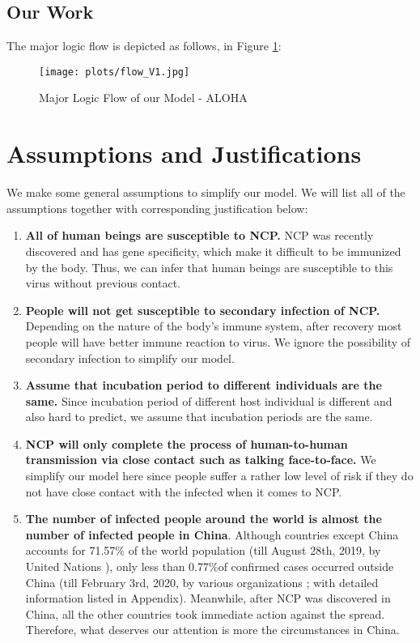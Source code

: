 \documentclass{mcmthesis}
\begin{document}
\subsection{Our Work}
	

	The major logic flow is depicted as follows, in Figure \ref{fig:flow}:
	
	\begin{figure}[H]
    \centering
    \texttt{[image: plots/flow\_V1.jpg]} %
    \caption{Major Logic Flow of our Model - ALOHA}
    \label{fig:flow}
    \end{figure}


\section{Assumptions and Justifications}\label{S2}
    We make some general assumptions to simplify our model. We will list all of the assumptions together with corresponding justification below:
\begin{enumerate}[1)]
	\item {\bfseries All of human beings are susceptible to NCP.} NCP was recently discovered and has gene specificity, which make it difficult to be immunized by the body. Thus, we can infer that human beings are susceptible to this virus without previous contact.
	\item {\bfseries People will not get susceptible to secondary infection of NCP.} Depending on the nature of the body's immune system, after recovery most people will have better immune reaction to virus. We ignore the possibility of secondary infection to simplify our model.
	\item {\bfseries Assume that incubation period to different individuals are the same.} Since incubation period of different host individual is different and also hard to predict, we assume that incubation periods are the same.
	\item {\bfseries NCP will only complete the process of human-to-human transmission via close contact such as talking face-to-face.} We simplify our model here since people suffer a rather low  level of risk if they do not have close contact with the infected when it comes to NCP.
	\item {\bfseries The number of infected people around the world is almost the number of infected people in China}. Although countries except China accounts for 71.57\% of the world population \small{(till August 28th, 2019, by United Nations \cite{pop_un})}, only less than  0.77\%of confirmed cases occurred outside China \small{(till February 3rd, 2020, by various organizations \cite{cov_who}\cite{cov_tencent}\cite{cov-jhu}\cite{cov-cdc}; with detailed information listed in Appendix)}. Meanwhile, after NCP was discovered in China, all the other countries took immediate action against the spread. Therefore, what deserves our attention is more the circumstances in China.
\end{enumerate}
\end{document}
